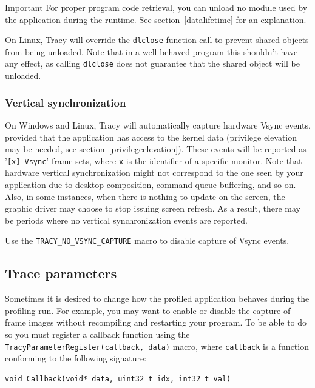 \documentclass[hidelinks,titlepage,a4paper]{article}
\begin{document}
\begin{bclogo}[
noborder=true,
couleur=black!5,
logo=\bcbombe
]{Important}
For proper program code retrieval, you can unload no module used by the application during the runtime. See section~\ref{datalifetime} for an explanation.

On Linux, Tracy will override the \texttt{dlclose} function call to prevent shared objects from being unloaded. Note that in a well-behaved program this shouldn't have any effect, as calling \texttt{dlclose} does not guarantee that the shared object will be unloaded.
\end{bclogo}

\subsubsection{Vertical synchronization}

On Windows and Linux, Tracy will automatically capture hardware Vsync events, provided that the application has access to the kernel data (privilege elevation may be needed, see section~\ref{privilegeelevation}). These events will be reported as '\texttt{[x] Vsync}' frame sets, where \texttt{x} is the identifier of a specific monitor. Note that hardware vertical synchronization might not correspond to the one seen by your application due to desktop composition, command queue buffering, and so on. Also, in some instances, when there is nothing to update on the screen, the graphic driver may choose to stop issuing screen refresh. As a result, there may be periods where no vertical synchronization events are reported.

Use the \texttt{TRACY\_NO\_VSYNC\_CAPTURE} macro to disable capture of Vsync events.

\subsection{Trace parameters}
\label{traceparameters}

Sometimes it is desired to change how the profiled application behaves during the profiling run. For example, you may want to enable or disable the capture of frame images without recompiling and restarting your program. To be able to do so you must register a callback function using the \texttt{TracyParameterRegister(callback, data)} macro, where \texttt{callback} is a function conforming to the following signature:

\begin{lstlisting}
void Callback(void* data, uint32_t idx, int32_t val)
\end{lstlisting}
\end{document}
